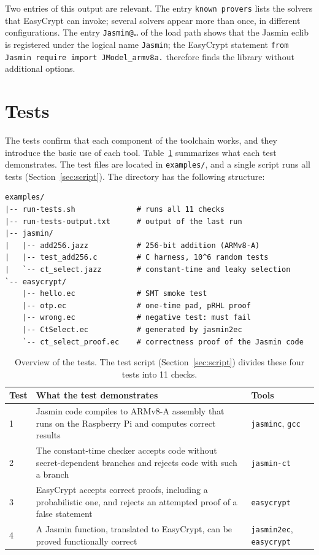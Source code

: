 \documentclass[11pt,a4paper]{article}
\newcommand{\file}[1]{\texttt{#1}}
\begin{document}
Two entries of this output are relevant. The entry \texttt{known provers}
lists the solvers that EasyCrypt can invoke; several solvers appear more than
once, in different configurations. The entry \texttt{Jasmin@\dots} of the
load path shows that the Jasmin eclib is registered under the logical name
\texttt{Jasmin}; the EasyCrypt statement
\lstinline[style=easycrypt,numbers=none,frame=none]|from Jasmin require import JModel_armv8a.|
therefore finds the library without additional options.

\section{Tests}
\label{sec:tests}

The tests confirm that each component of the toolchain works, and they
introduce the basic use of each tool. Table~\ref{tab:tests} summarizes what
each test demonstrates. The test files are located in \file{examples/}, and
a single script runs all tests (Section~\ref{sec:script}). The directory
has the following structure:

\begin{lstlisting}[style=output]
examples/
|-- run-tests.sh              # runs all 11 checks
|-- run-tests-output.txt      # output of the last run
|-- jasmin/
|   |-- add256.jazz           # 256-bit addition (ARMv8-A)
|   |-- test_add256.c         # C harness, 10^6 random tests
|   `-- ct_select.jazz        # constant-time and leaky selection
`-- easycrypt/
    |-- hello.ec              # SMT smoke test
    |-- otp.ec                # one-time pad, pRHL proof
    |-- wrong.ec              # negative test: must fail
    |-- CtSelect.ec           # generated by jasmin2ec
    `-- ct_select_proof.ec    # correctness proof of the Jasmin code
\end{lstlisting}

\begin{table}[h]
\centering\small
\begin{tabularx}{\textwidth}{@{}lXl@{}}
\toprule
\textbf{Test} & \textbf{What the test demonstrates} & \textbf{Tools} \\
\midrule
1 & Jasmin code compiles to ARMv8-A assembly that runs on the Raspberry Pi and computes correct results & \texttt{jasminc}, \texttt{gcc} \\
2 & The constant-time checker accepts code without secret-dependent branches and rejects code with such a branch & \texttt{jasmin-ct} \\
3 & EasyCrypt accepts correct proofs, including a probabilistic one, and rejects an attempted proof of a false statement & \texttt{easycrypt} \\
4 & A Jasmin function, translated to EasyCrypt, can be proved functionally correct & \texttt{jasmin2ec}, \texttt{easycrypt} \\
\bottomrule
\end{tabularx}
\caption{Overview of the tests. The test script (Section~\ref{sec:script}) divides these four tests into 11 checks.}
\label{tab:tests}
\end{table}
\end{document}

